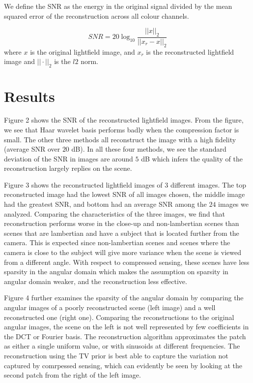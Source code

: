 \documentclass[10pt,twocolumn,letterpaper]{article}
\begin{document}
We define the SNR as the energy in the original signal divided by the mean squared error of the reconstruction across all colour channels. 

\[SNR = 20 \log_{10}{\frac{||x||_2}{||x_r - x||_2}}\] where $x$ is the original lightfield image, and $x_r$ is the reconstructed lightfield image and $|| \cdot ||_2$ is the $l2$ norm.



\section{Results}

Figure 2 shows the SNR of the reconstructed lightfield images.  From the figure, we see that Haar wavelet basis performs badly when the compression factor is small. The other three methods all reconstruct the image with a high fidelity (average SNR over $20$ dB). In all these four methods, we see the standard deviation of the SNR in images are around $5$ dB which infers the quality of the reconstruction largely replies on the scene. 

Figure 3 shows the reconstructed lightfield images of 3 different images. The top reconstructed image had the lowest SNR of all images chosen, the middle image had the greatest SNR, and bottom had an average SNR among the $24$ images we analyzed. Comparing the characteristics of the three images, we find that reconstruction performs worse in the close-up and non-lambertian scenes than scenes that are lambertian and have a subject that is located further from the camera. This is expected since non-lambertian scenes and scenes where the camera is close to the subject will give more variance when the scene is viewed from a different angle. With respect to compressed sensing, these scenes have less sparsity in the angular domain which makes the assumption on sparsity in angular domain weaker, and the reconstruction less effective. 

Figure 4 further examines the sparsity of the angular domain by comparing the angular images of a poorly reconstructed scene (left image) and a well reconstructed one (right one). Comparing the reconstructions to the original angular images, the scene on the left is not well represented by few coefficients in the DCT or Fourier basis. The reconstruction algorithm approximates the patch as either a single uniform value, or with sinusoids at different frequencies. The reconstruction using the TV prior is best able to capture the variation not captured by comrpessed sensing, which can evidently be seen by looking at the second patch from the right of the left image.
\end{document}
